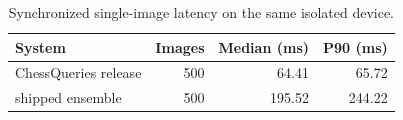 \begingroup\small
\setlength{\tabcolsep}{4pt}
\begin{table}[htbp]\centering
\caption{Synchronized single-image latency on the same isolated device.}\label{tab:timing}
\begin{tabular}{lrrr}
\toprule
System & %
Images & %
Median (ms) & %
P90 (ms) \\ %
\midrule

ChessQueries release & %
500 & %
64.41 & %
65.72 \\ %

shipped ensemble & %
500 & %
195.52 & %
244.22 \\ %


\end{tabular}
\end{table}
